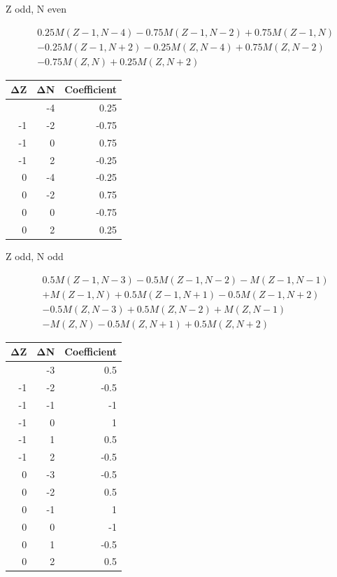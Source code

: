 \documentclass[
  11pt,
  letterpaper,
]{article}
\begin{document}
Z odd, N even

\[
\begin{aligned}
& 0.25M(Z-1,N-4)-0.75M(Z-1,N-2)+0.75M(Z-1,N) \\
& -0.25M(Z-1,N+2)-0.25M(Z,N-4)+0.75M(Z,N-2) \\
& -0.75M(Z,N)+0.25M(Z,N+2)
\end{aligned}
\]

\begin{longtable}[]{@{}rrr@{}}
\toprule\noalign{}
ΔZ & ΔN & Coefficient \\
\midrule\noalign{}
\endhead
\bottomrule\noalign{}
\endlastfoot
-1 & -4 & 0.25 \\
-1 & -2 & -0.75 \\
-1 & 0 & 0.75 \\
-1 & 2 & -0.25 \\
0 & -4 & -0.25 \\
0 & -2 & 0.75 \\
0 & 0 & -0.75 \\
0 & 2 & 0.25 \\
\end{longtable}

Z odd, N odd

\[
\begin{aligned}
& 0.5M(Z-1,N-3)-0.5M(Z-1,N-2)-M(Z-1,N-1) \\
& +M(Z-1,N)+0.5M(Z-1,N+1)-0.5M(Z-1,N+2) \\
& -0.5M(Z,N-3)+0.5M(Z,N-2)+M(Z,N-1) \\
& -M(Z,N)-0.5M(Z,N+1)+0.5M(Z,N+2)
\end{aligned}
\]

\begin{longtable}[]{@{}rrr@{}}
\toprule\noalign{}
ΔZ & ΔN & Coefficient \\
\midrule\noalign{}
\endhead
\bottomrule\noalign{}
\endlastfoot
-1 & -3 & 0.5 \\
-1 & -2 & -0.5 \\
-1 & -1 & -1 \\
-1 & 0 & 1 \\
-1 & 1 & 0.5 \\
-1 & 2 & -0.5 \\
0 & -3 & -0.5 \\
0 & -2 & 0.5 \\
0 & -1 & 1 \\
0 & 0 & -1 \\
0 & 1 & -0.5 \\
0 & 2 & 0.5 \\
\end{longtable}
\end{document}
